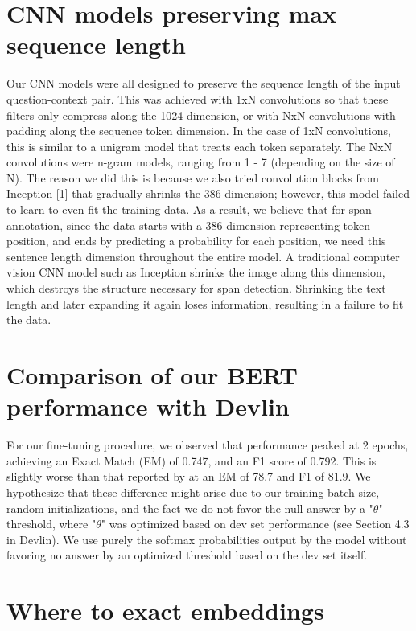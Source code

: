 \section{CNN models preserving max sequence length}
\label{apdx:cnn_models_preserving_seq_length}

Our CNN models were all designed to preserve the sequence length of the input question-context pair. This was achieved with 1xN convolutions so that these filters only compress along the 1024 dimension, or with NxN convolutions with padding along the sequence token dimension. In the case of 1xN convolutions, this is similar to a unigram model that treats each token separately. The NxN convolutions were n-gram models, ranging from 1 - 7 (depending on the size of N). The reason we did this is because we also tried convolution blocks from Inception [1] that gradually shrinks the 386 dimension; however, this model failed to learn to even fit the training data. As a result, we believe that for span annotation, since the data starts with a 386 dimension representing token position, and ends by predicting a probability for each position, we need this sentence length dimension throughout the entire model. A traditional computer vision CNN model such as Inception shrinks the image along this dimension, which destroys the structure necessary for span detection. Shrinking the text length and later expanding it again loses information, resulting in a failure to fit the data.

\section{Comparison of our BERT performance with Devlin}
\label{apdx:comparison_with_devlin}

For our fine-tuning procedure, we observed that performance peaked at 2 epochs, achieving an Exact Match (EM) of 0.747, and an F1 score of 0.792. This is slightly worse than that reported by \cite{Devlin2019} at an EM of 78.7 and F1 of 81.9. We hypothesize that these difference might arise due to our training batch size, random initializations, and the fact we do not favor the null answer by a "$\theta$" threshold, where "$\theta$" was optimized based on dev set performance (see Section 4.3 in Devlin). We use purely the softmax probabilities output by the model without favoring no answer by an optimized threshold based on the dev set itself.

\section{Where to exact embeddings}
\label{apdx:where_to_extract_embeddings}

